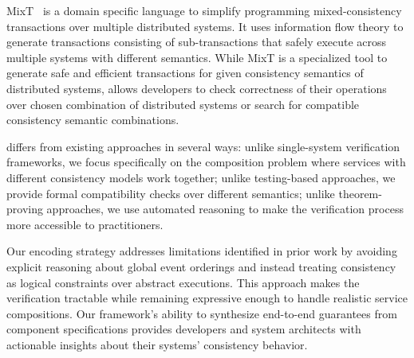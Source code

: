 MixT~\cite{mixt} is a domain specific language to simplify
programming mixed-consistency transactions over multiple
distributed systems. It uses information flow theory to
generate transactions consisting of sub-transactions
that safely execute across multiple systems with different
semantics. While MixT is a specialized tool to generate
safe and efficient transactions for given consistency semantics
of distributed systems, \sysname{} allows developers to check
correctness of their operations over chosen combination of
distributed systems or search for compatible consistency
semantic combinations.

\sysname{} differs from existing approaches in several ways:
unlike single-system verification frameworks,
we focus specifically on the composition problem where services with
different consistency models work together; unlike testing-based
approaches, we provide formal compatibility checks over different semantics;
unlike theorem-proving approaches, we use automated reasoning to make
the verification process more accessible to practitioners.

Our encoding strategy addresses limitations identified in prior work
by avoiding explicit reasoning about global event orderings and
instead treating consistency as logical constraints over abstract
executions. This approach makes the verification tractable
while remaining expressive enough to handle realistic service
compositions. Our framework's ability to synthesize end-to-end
guarantees from component specifications provides developers and
system architects with actionable insights about their systems'
consistency behavior.



